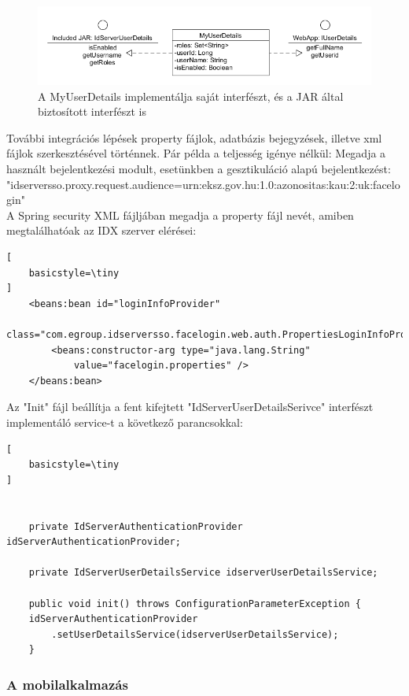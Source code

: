\begin{figure}[h]
 \begin{minipage}{1\textwidth} 
    \includegraphics[scale=0.6]{img/userdetails}
    \caption{A MyUserDetails implementálja saját interfészt, és a JAR által biztosított interfészt is}
 \end{minipage}
\end{figure}

\newpage
További integrációs lépések property fájlok, adatbázis bejegyzések, illetve xml fájlok szerkesztésével történnek. Pár példa a teljesség igénye nélkül:
Megadja a használt bejelentkezési modult, esetünkben a gesztikuláció alapú bejelentkezést: \\
"idserversso.proxy.request.audience=urn:eksz.gov.hu:1.0:azonositas:kau:2:uk:facelogin"
\\
A Spring security XML fájljában megadja a property fájl nevét, amiben megtalálhatóak az IDX szerver elérései:
\begin{lstlisting}[
    basicstyle=\tiny
]
	<beans:bean id="loginInfoProvider"
		class="com.egroup.idserversso.facelogin.web.auth.PropertiesLoginInfoProvider">
		<beans:constructor-arg type="java.lang.String"
			value="facelogin.properties" />
	</beans:bean>

\end{lstlisting}

Az "Init" fájl beállítja a fent kifejtett "IdServerUserDetailsSerivce" interfészt implementáló service-t a következő parancsokkal:
\begin{lstlisting}[
    basicstyle=\tiny
]
	

    private IdServerAuthenticationProvider idServerAuthenticationProvider;

    private IdServerUserDetailsService idserverUserDetailsService;

    public void init() throws ConfigurationParameterException {
	idServerAuthenticationProvider
		.setUserDetailsService(idserverUserDetailsService);
    }

\end{lstlisting}

\subsubsection{A mobilalkalmazás}

